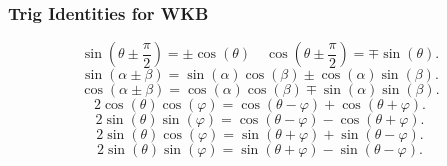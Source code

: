 \documentclass{article}
\begin{document}
    \subsubsection*{Trig Identities for WKB}
      \[
        \sin(\theta \pm \frac{ \pi}{2}) = \pm\cos(\theta) \quad
        \cos(\theta \pm \frac{\pi}{2}) = \mp\sin(\theta)
      .\] 
      \[
        \sin(\alpha \pm \beta) = \sin(\alpha)\cos(\beta) \pm \cos(\alpha)\sin(\beta)
      .\] 
      \[
        \cos(\alpha \pm \beta) = \cos(\alpha)\cos(\beta) \mp \sin(\alpha) \sin(\beta)
      .\] 
      \[
        2\cos(\theta)\cos(\varphi) = \cos(\theta - \varphi) + \cos(\theta + \varphi)
      .\] 
       \[
         2\sin(\theta)\sin(\varphi) = \cos(\theta - \varphi) - \cos(\theta + \varphi)
      .\] 
      \[
        2 \sin(\theta)\cos(\varphi) = \sin(\theta + \varphi) + \sin(\theta - \varphi)
      .\] 
      \[
        2\sin(\theta)\sin(\varphi) = \sin(\theta + \varphi) - \sin(\theta - \varphi)
      .\] 
\end{document}
